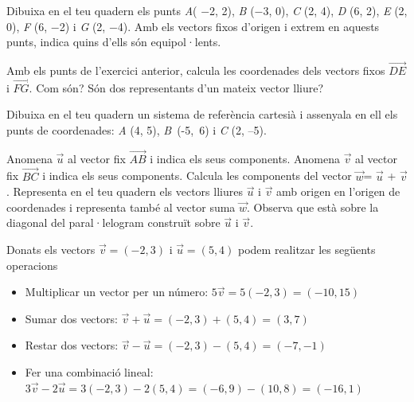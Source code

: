 \begin{mylist}
\exer  Dibuixa en el teu quadern els punts \textit{A}( $-$2, 2), \textit{B} ($-$3, 0), \textit{C} (2, 4), \textit{D} (6, 2), \textit{E} (2, 0), \linebreak \textit{F} (6, $-$2) i \textit{G }(2, $-$4). Amb els vectors fixos d'origen i extrem en aquests punts, indica quins d'ells són equipol·lents.

\exer  Amb els punts de l'exercici anterior, calcula les coordenades dels vectors fixos $\overrightarrow{DE}$ i $\overrightarrow{FG}$. Com són? Són dos representants d'un mateix vector lliure?


\exer  Dibuixa en el teu quadern un sistema de referència cartesià i assenyala en ell els punts de coordenades: \textit{A} (4, 5), \textit{B}~(-5,~6) i \textit{C} (2, --5).


\begin{tasks}
	\task  Anomena $\vec u$ al vector fix $\overrightarrow{AB}$ i indica els seus components.
	\task  Anomena $\vec v$ al vector fix $\overrightarrow{BC}$ i indica els seus components.
	\task  Calcula les components del vector $\vec w$= $\vec u$ + $\vec v$.
	\task  Representa en el teu quadern els vectors lliures $\vec u$ i $\vec v$ amb origen en l'origen de coordenades i representa també al vector suma $\vec w$. Observa que està sobre la diagonal del paral·lelogram construït sobre $\vec u$ i $\vec v$.
\end{tasks}

\answers[cols=1]{[$\vec u = (-9,-11)$, $\vec v=(7,-11)$, $\vec w=(-2,-10)$]}

\end{mylist}

\begin{theorybox}
Donats els vectors $\vec v =(-2, 3)$ i $\vec u=(5, 4)$ podem realitzar les següents operacions
\begin{itemize}
	\item  Multiplicar un vector per un número:  $5 \vec v = 5 (-2, 3)=(-10, 15)$ 
	\item Sumar dos vectors:  $\vec v + \vec u = (-2, 3) + (5, 4) = (3, 7)$
	\item Restar dos vectors:  $\vec v - \vec u = (-2, 3) - (5, 4) = (-7, -1)$
	\item Fer una combinació lineal:  $3\vec v - 2\vec u = 3(-2, 3) - 2(5, 4) = (-6, 9) - (10, 8) = (-16, 1)$ 
\end{itemize}
\end{theorybox}

